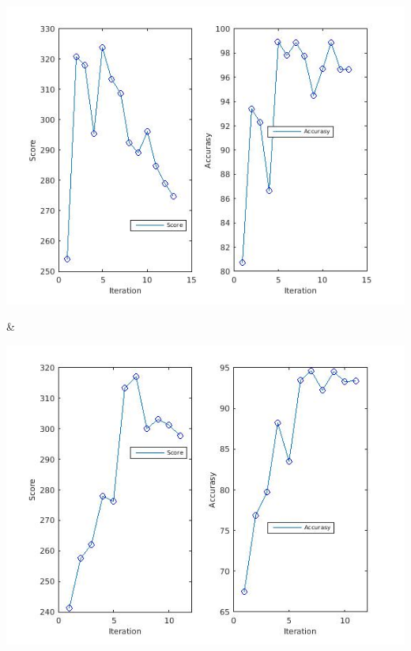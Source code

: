 \documentclass[
	fontsize=12pt,
	paper=a4,
	twoside=false,
	numbers=noenddot,
	plainheadsepline,
	toc=listof,
	toc=bibliography
]{scrartcl}
\begin{document}
\begin{table}
\begin{tabular}
		\rule{0pt}{5cm}
 		\parbox[b]{1em}{
			\includegraphics[scale = 0.28]{fig/method2/test3/accuracy_LL.jpg}} &
		\parbox[b]{1em}{
			\includegraphics[scale = 0.28]{test3/accuracy_LL.jpg}}  \\
		\hline			
		
	\end{tabular}
\end{table}





	
\end{document}
